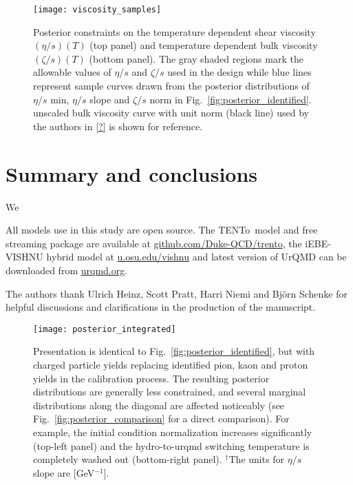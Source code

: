 \documentclass[aps,prc,reprint,amsmath,nofootinbib]{revtex4-1}
\newcommand{\trento}{T\raisebox{-0.5ex}{R}ENTo}
\begin{document}
\begin{figure}
    \texttt{[image: viscosity\_samples]}
    \caption{Posterior constraints on the temperature dependent shear viscosity $(\eta/s)(T)$ (top panel) and temperature dependent bulk viscosity $(\zeta/s)(T)$ (bottom panel). The gray shaded regions mark the allowable values of $\eta/s$ and $\zeta/s$ used in the design while blue lines represent sample curves drawn from the posterior distributions of $\eta/s$ min, $\eta/s$ slope and $\zeta/s$ norm in Fig.~\ref{fig:posterior_identified}. unscaled bulk viscosity curve with unit norm (black line) used by the authors in \ref{?} is shown for reference.}
\end{figure}

\section{Summary and conclusions}

We  

\medskip
All models use in this study are open source. The \trento\ model and free streaming package are available at \url{github.com/Duke-QCD/trento}, the iEBE-VISHNU hybrid model at \url{u.osu.edu/vishnu} and latest version of UrQMD can be downloaded from \url{urqmd.org}.

\acknowledgements
The authors thank Ulrich Heinz, Scott Pratt, Harri Niemi and Bj\"orn Schenke for helpful discussions and clarifications in the production of the manuscript.
\appendix

\begin{figure*}
    \texttt{[image: posterior\_integrated]}
    \caption{Presentation is identical to Fig.~\ref{fig:posterior_identified}, but with charged particle yields replacing identified pion, kaon and proton yields in the calibration process. The resulting posterior distributions are generally less constrained, and several marginal distributions along the diagonal are affected noticeably (see Fig.~\ref{fig:posterior_comparison} for a direct comparison). For example, the initial condition normalization increases significantly (top-left panel) and the hydro-to-urqmd switching temperature is completely washed out (bottom-right panel). $^\dagger$The units for $\eta/s$ slope are [GeV$^{-1}$]. }
\end{figure*}



\end{document}
